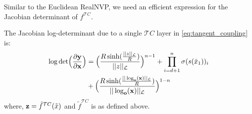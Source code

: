 Similar to the Euclidean RealNVP, we need an efficient expression for the Jacobian determinant of $f^{\mathcal{T}C}$.
\begin{prop}
The Jacobian log-determinant due to a single $\mathcal{T}C$ layer in \eqref{eq:tangent_coupling} is:
\begin{align*}
\cut{
    \textnormal{det}\Big (\frac{\partial \textbf{y}}{\partial \textbf{x}}\Big) =  \textnormal{det}\Big (\frac{\partial \textnormal{exp}_{\textbf{o}}(z)}{\partial z}\Big) \cdot \textnormal{det}\Big (\frac{\partial f(\tilde{x})}{\partial \tilde{x}}\Big) \cdot  \textnormal{det}\Big (\frac{\partial \log_{\textbf{o}}(\textbf{x})}{\partial \textbf{x}}\Big)
    }
     \log \textnormal{det}\Big (\frac{\partial \textbf{y}}{\partial \textbf{x}}\Big) &= \Big(\frac{R\sinh(\frac{||z||_{\mathcal{L}}}{R})}{||z||_{\mathcal{L}}}\Big)^{n-1} + \prod_{i=d+1}^n\sigma(s(\tilde{x}_1))_i \\
     & + \Big(\frac{R\sinh(\frac{||\log_{\textbf{o}}(\textbf{x})||_{\mathcal{L}}}{R})}{||\log_{\textbf{o}}(\textbf{x})||_{\mathcal{L}}}\Big)^{1-n}
\end{align*}
where, $ \mathbf{z} =  \tilde{f}^{\mathcal{T}C}(\tilde{x})$ and $\tilde{f}^{\mathcal{T}C}$ is as defined above.
\end{prop}
